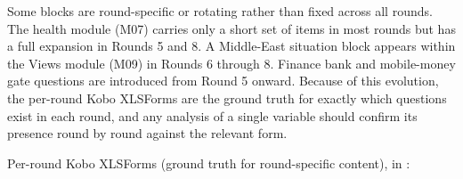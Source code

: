 Some blocks are round-specific or rotating rather than fixed across all rounds. The health
module (M07) carries only a short set of items in most rounds but has a full expansion in
Rounds 5 and 8. A Middle-East situation block appears within the Views module (M09) in
Rounds 6 through 8. Finance bank and mobile-money gate questions are introduced from Round
5 onward. Because of this evolution, the per-round Kobo XLSForms are the ground truth for
exactly which questions exist in each round, and any analysis of a single variable should
confirm its presence round by round against the relevant form.

\begin{sloppypar}
\begin{refbox}
Per-round Kobo XLSForms (ground truth for round-specific content), in :\\
\\
\\
\\
\\
\\
\\
\\
\\
\end{refbox}
\end{sloppypar}
